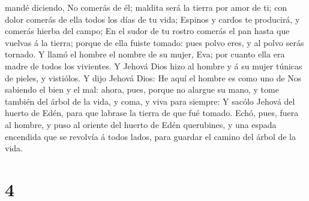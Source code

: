 mandé diciendo, No comerás de él; maldita será la tierra por amor de ti;
con dolor comerás de ella todos los días de tu vida; 
Espinos y cardos te producirá, y comerás hierba del campo;
 En el sudor de tu rostro comerás el pan hasta que
vuelvas á la tierra; porque de ella fuiste tomado: pues polvo eres, y al
polvo serás tornado.  Y llamó el hombre el nombre de su
mujer, Eva; por cuanto ella era madre de todos los vivientes.
 Y Jehová Dios hizo al hombre y á su mujer túnicas de
pieles, y vistiólos.  Y dijo Jehová Dios: He aquí el
hombre es como uno de Nos sabiendo el bien y el mal: ahora, pues, porque
no alargue su mano, y tome también del árbol de la vida, y coma, y viva
para siempre:  Y sacólo Jehová del huerto de Edén, para
que labrase la tierra de que fué tomado.  Echó, pues,
fuera al hombre, y puso al oriente del huerto de Edén querubines, y una
espada encendida que se revolvía á todos lados, para guardar el camino
del árbol de la vida.

\hypertarget{section-3}{%
\section{4}\label{section-3}}

